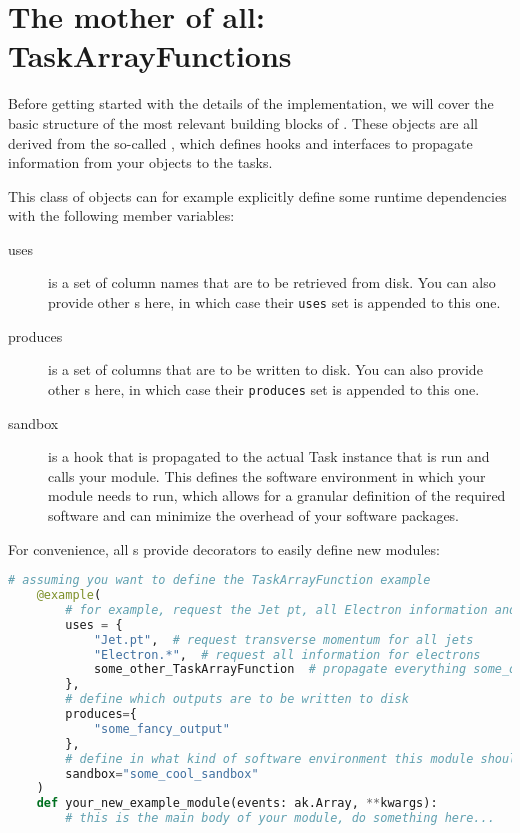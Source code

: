

\section{The mother of all: TaskArrayFunctions}\label{sec:taskarrayfunc}

Before getting started with the details of the implementation, we will cover the basic structure of the most relevant building blocks of \columnflow.
These objects are all derived from the so-called , which defines hooks and interfaces to propagate information from your objects to the \columnflow tasks.

This class of objects can for example explicitly define some runtime dependencies with the following member variables:
\begin{description}
	\item[uses] is a set of column names that are to be retrieved from disk.
	You can also provide other s here, in which case their \texttt{uses} set is appended to this one.
	\item[produces] is a set of columns that are to be written to disk.
	You can also provide other s here, in which case their \texttt{produces} set is appended to this one.
	\item[sandbox] is a hook that is propagated to the actual Task instance that is run and calls your module.
	This defines the software environment in which your module needs to run, which allows for a granular definition of the required software and can minimize the overhead of your software packages.
	
\end{description}

For convenience, all  s provide decorators to easily define new modules:

\begin{lstlisting}[language=python]
	# assuming you want to define the TaskArrayFunction example
	@example(
		# for example, request the Jet pt, all Electron information and everything another 
		uses = {
			"Jet.pt",  # request transverse momentum for all jets
			"Electron.*",  # request all information for electrons
			some_other_TaskArrayFunction  # propagate everything some_other_TaskArrayFunction needs to this example TaskArrayFunction
	    },
	    # define which outputs are to be written to disk
	    produces={
	    	"some_fancy_output"
	    },
	    # define in what kind of software environment this module should be run
	    sandbox="some_cool_sandbox"
	)
	def your_new_example_module(events: ak.Array, **kwargs):
	    # this is the main body of your module, do something here...
\end{lstlisting}

